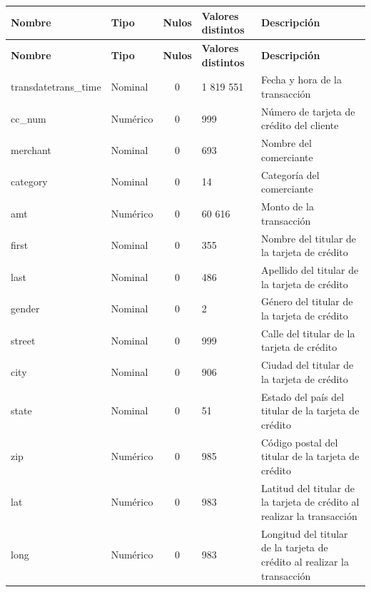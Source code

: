 	\begin{longtable} {p{3.5cm} p{2cm} c p{2cm} p{6cm}}
		\toprule
		\textbf{Nombre} & \textbf{Tipo} & \textbf{Nulos} & \textbf{Valores distintos} & \textbf{Descripción} \\
		\midrule
		\endfirsthead
		
		\toprule
		\textbf{Nombre} & \textbf{Tipo} & \textbf{Nulos} & \textbf{Valores distintos} & \textbf{Descripción} \\
		\midrule
		\endhead
		
		\hline
		\endfoot
		
		\endlastfoot
	
		transdatetrans\_time & Nominal & 0 & 1 819 551 & Fecha y hora de la transacción\\
		\addlinespace
		cc\_num & Numérico & 0 & 999 & Número de tarjeta de crédito del cliente\\
		\addlinespace
		merchant & Nominal & 0 & 693 & Nombre del comerciante \\
		\addlinespace
		category & Nominal & 0 & 14 & Categoría del comerciante \\
		\addlinespace
		amt & Numérico & 0 & 60 616 & Monto de la transacción \\
		\addlinespace
		first & Nominal & 0 & 355 & Nombre del titular de la tarjeta de crédito \\
		\addlinespace
		last & Nominal & 0 & 486 & Apellido del titular de la tarjeta de crédito \\
		\addlinespace
		gender & Nominal & 0 & 2 & Género del titular de la tarjeta de crédito \\
		\addlinespace
		street &  Nominal & 0 & 999 & Calle del titular de la tarjeta de crédito \\
		\addlinespace
		city &  Nominal & 0 & 906 & Ciudad del titular de la tarjeta de crédito \\
		\addlinespace
		state &  Nominal & 0 & 51 & Estado del país del titular de la tarjeta de crédito\\
		\addlinespace
		zip & Numérico & 0 & 985 & Código postal del titular de la tarjeta de crédito \\
		\addlinespace
		lat & Numérico & 0 & 983 & Latitud del titular de la tarjeta de crédito al realizar la transacción\\
		\addlinespace
		long & Numérico & 0 & 983 & Longitud del titular de la tarjeta de crédito al realizar la transacción \\

\end{longtable}
